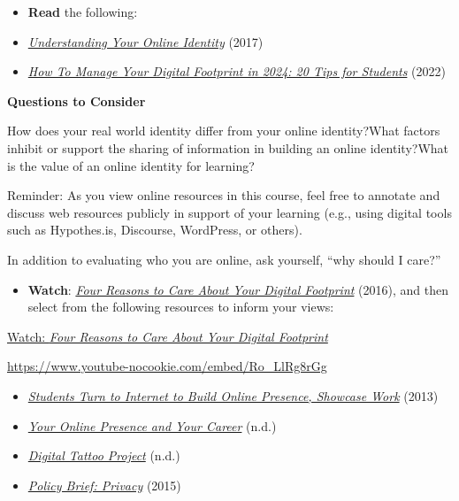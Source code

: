 \documentclass[
  letterpaper,
  DIV=11,
  numbers=noendperiod]{scrreprt}
\providecommand{\tightlist}{%
  \setlength{\itemsep}{0pt}\setlength{\parskip}{0pt}}\usepackage{longtable,booktabs,array}
\begin{document}
\begin{tcolorbox}[enhanced jigsaw, toprule=.15mm, colback=white, colframe=quarto-callout-note-color-frame, bottomtitle=1mm, leftrule=.75mm, coltitle=black, titlerule=0mm, rightrule=.15mm, colbacktitle=quarto-callout-note-color!10!white, left=2mm, title={Learning Activity}, opacitybacktitle=0.6, opacityback=0, breakable, toptitle=1mm, arc=.35mm, bottomrule=.15mm]

\begin{itemize}
\item
  \textbf{Read} the following:
\item
  \href{assets/u4/U4_Understanding-your-Online-Identity-An-Overview-of-Identity.pdf}{\emph{Understanding
  Your Online Identity}} (2017)
\item
  \emph{\href{https://research.com/education/how-to-manage-digital-footprint}{How
  To Manage Your Digital Footprint in 2024: 20 Tips for Students}}
  (2022)
\end{itemize}

\textbf{Questions to Consider}

How does your real world identity differ from your online identity?What
factors inhibit or support the sharing of information in building an
online identity?What is the value of an online identity for learning?

Reminder: As you view online resources in this course, feel free to
annotate and discuss web resources publicly in support of your learning
(e.g., using digital tools such as Hypothes.is, Discourse, WordPress, or
others).

In addition to evaluating who you are online, ask yourself, ``why should
I care?''

\begin{itemize}
\tightlist
\item
  \textbf{Watch}:
  \href{https://www.youtube.com/watch?v=Ro_LlRg8rGg}{\emph{Four Reasons
  to Care About Your Digital Footprint}} (2016), and then select from
  the following resources to inform your views:
\end{itemize}

\href{https://www.youtube.com/watch?v=Ro_LlRg8rGg}{Watch: \emph{Four
Reasons to Care About Your Digital Footprint}}

\url{https://www.youtube-nocookie.com/embed/Ro_LlRg8rGg}

\begin{itemize}
\tightlist
\item
  \href{https://www.huffpost.com/entry/students-turn-to-internet_b_3518598}{\emph{Students
  Turn to Internet to Build Online Presence, Showcase Work}} (2013)
\item
  \href{https://help.open.ac.uk/your-online-presence}{\emph{Your Online
  Presence and Your Career}} (n.d.)
\item
  \emph{\href{https://digitaltattoo.ubc.ca/}{Digital Tattoo Project}}
  (n.d.)
\item
  \href{https://www.internetsociety.org/policybriefs/privacy/}{\emph{Policy
  Brief: Privacy}} (2015)
\end{itemize}


\end{tcolorbox}
\end{document}
